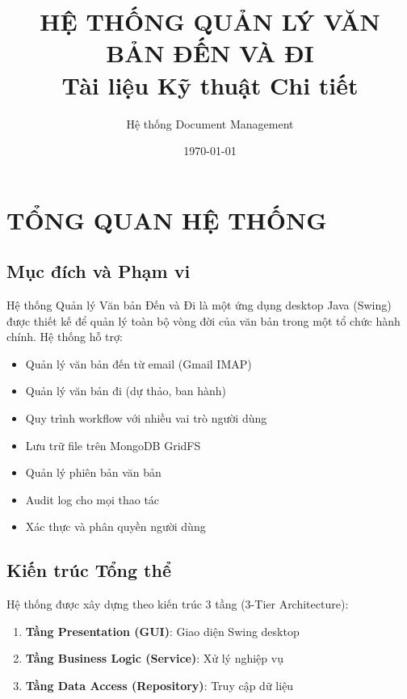 \documentclass[12pt,a4paper]{article}
\title{\textbf{HỆ THỐNG QUẢN LÝ VĂN BẢN ĐẾN VÀ ĐI}\\
\large Tài liệu Kỹ thuật Chi tiết}
\author{Hệ thống Document Management}
\date{\today}
\begin{document}
\maketitle
\tableofcontents
\newpage

\section{TỔNG QUAN HỆ THỐNG}

\subsection{Mục đích và Phạm vi}
Hệ thống Quản lý Văn bản Đến và Đi là một ứng dụng desktop Java (Swing) được thiết kế để quản lý toàn bộ vòng đời của văn bản trong một tổ chức hành chính. Hệ thống hỗ trợ:

\begin{itemize}
    \item Quản lý văn bản đến từ email (Gmail IMAP)
    \item Quản lý văn bản đi (dự thảo, ban hành)
    \item Quy trình workflow với nhiều vai trò người dùng
    \item Lưu trữ file trên MongoDB GridFS
    \item Quản lý phiên bản văn bản
    \item Audit log cho mọi thao tác
    \item Xác thực và phân quyền người dùng
\end{itemize}

\subsection{Kiến trúc Tổng thể}
Hệ thống được xây dựng theo kiến trúc 3 tầng (3-Tier Architecture):

\begin{enumerate}
    \item \textbf{Tầng Presentation (GUI)}: Giao diện Swing desktop
    \item \textbf{Tầng Business Logic (Service)}: Xử lý nghiệp vụ
    \item \textbf{Tầng Data Access (Repository)}: Truy cập dữ liệu
\end{enumerate}
\end{document}
